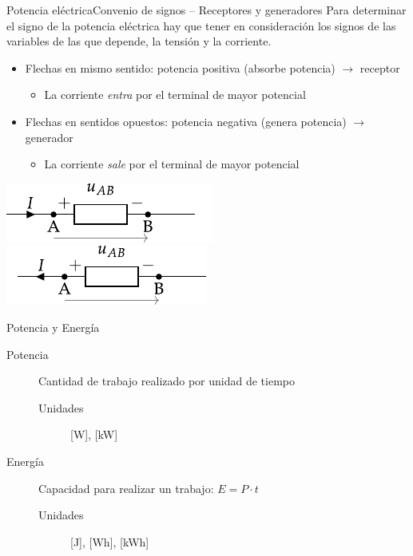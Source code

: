 \documentclass[aspectratio=169, xcolor={usenames,svgnames,dvipsnames}]{beamer}
\begin{document}
\begin{frame}{Potencia eléctrica}{Convenio de signos -- Receptores y generadores}
Para determinar el \alert{signo de la potencia eléctrica} hay que tener en consideración los signos de las variables de las que depende, la tensión y la corriente. 
\begin{itemize}
\item Flechas en \alert{mismo sentido}: potencia \alert{positiva} (absorbe potencia) $\rightarrow$ \alert{receptor}
\begin{itemize}
    \item La corriente \emph{entra} por el terminal de mayor potencial
\end{itemize}
\item Flechas en \alert{sentidos opuestos}: potencia \alert{negativa} (genera potencia) $\rightarrow$ \alert{generador}
\begin{itemize}
    \item La corriente \emph{sale} por el terminal de mayor potencial
\end{itemize}
\end{itemize}

\begin{center}
\includegraphics[height=0.17\textheight]{../figs/signo_potencia1.pdf}
\hfil
\includegraphics[height=0.17\textheight]{../figs/signo_potencia2.pdf}
\end{center}
\end{frame}

\begin{frame}{Potencia y Energía}
\begin{description}
\item[{Potencia}] Cantidad de trabajo realizado por unidad de tiempo
\begin{description}
\item[{Unidades}] [W], [kW]
\end{description}
\item[{Energía}] Capacidad para realizar un trabajo: $E=P\cdot t$
\begin{description}
\item[{Unidades}] [J], [Wh], [kWh]
\end{description}
\end{description}
\end{frame}
\end{document}
